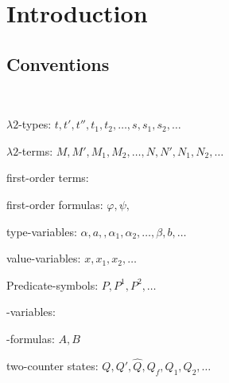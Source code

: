 \section{Introduction}

\subsection{Conventions}
~

$\lambda2$-types: $t, t', t'', t_1, t_2, \dots,s,s_1,s_2,\dots$

$\lambda2$-terms: $M, M', M_1, M_2,\dots, N, N', N_1, N_2, \dots$

first-order terms: 

first-order formulas: $\varphi,\psi,$

type-variables: $\alpha, a, ,\alpha_1, \alpha_2, \dots, \beta, b, \dots$

value-variables: $x, x_1 , x_2 ,\dots$

Predicate-symbols: $P,P^1,P^2,\dots$

\SysP-variables:

\SysP-formulas: $A, B$

two-counter states: $Q,Q',\widehat{Q},Q_f,Q_1,Q_2,\dots$
